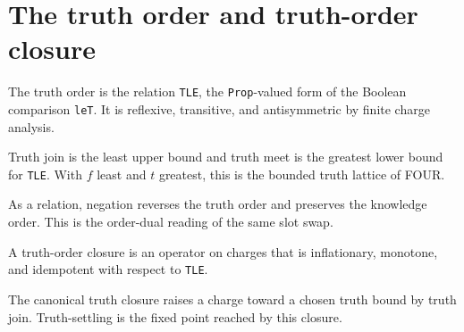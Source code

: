 \section{The truth order and truth-order closure}

\begin{proposition}\label{thm:tle}\leanok{}
The truth order is the relation \texttt{TLE}, the \texttt{Prop}-valued form
of the Boolean comparison \texttt{leT}. It is reflexive, transitive, and
antisymmetric by finite charge analysis.
\end{proposition}

\begin{theorem}\label{thm:truth-lattice}\leanok{}
Truth join is the least upper bound and truth meet is the greatest lower
bound for \texttt{TLE}. With $f$ least and $t$ greatest, this is the bounded
truth lattice of FOUR.
\end{theorem}

\begin{theorem}\label{thm:negate-tle}\leanok{}
As a relation, negation reverses the truth order and preserves the knowledge
order. This is the order-dual reading of the same slot swap.
\end{theorem}

\begin{proposition}\label{thm:tclosure}\leanok{}
A truth-order closure is an operator on charges that is inflationary,
monotone, and idempotent with respect to \texttt{TLE}.
\end{proposition}

\begin{proposition}\label{thm:settleT}\leanok{}
The canonical truth closure raises a charge toward a chosen truth bound by
truth join. Truth-settling is the fixed point reached by this closure.
\end{proposition}
